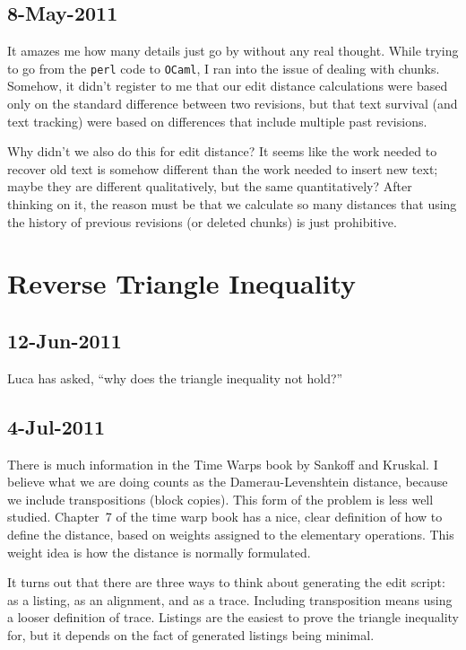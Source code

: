 \subsection{8-May-2011}

It amazes me how many details just go by without any real thought.
While trying to go from the \texttt{perl} code to \texttt{OCaml},
I ran into the issue of dealing with chunks.
Somehow, it didn't register to me that our edit distance calculations
were based only on the standard difference between two revisions,
but that text survival (and text tracking) were based on differences
that include multiple past revisions.

Why didn't we also do this for edit distance?
It seems like the work needed to recover old text
is somehow different than the work needed to insert new text;
maybe they are different qualitatively, but the same quantitatively?
After thinking on it, the reason must be that we calculate so many distances
that using the history of previous revisions (or deleted chunks) is
just prohibitive.

\section{Reverse Triangle Inequality}

\subsection{12-Jun-2011}

Luca has asked, ``why does the triangle inequality not hold?''

\subsection{4-Jul-2011}

There is much information in the Time Warps book by
Sankoff and Kruskal.
I believe what we are doing counts as the Damerau-Levenshtein
distance, because we include transpositions (block copies).
This form of the problem is less well studied.
Chapter~7 of the time warp book has a nice, clear definition
of how to define the distance, based on weights assigned
to the elementary operations.
This weight idea is how the distance is normally formulated.

It turns out that there are three ways to think about generating
the edit script: as a listing, as an alignment, and as a trace.
Including transposition means using a looser definition of trace.
Listings are the easiest to prove the triangle inequality for,
but it depends on the fact of generated listings being minimal.

